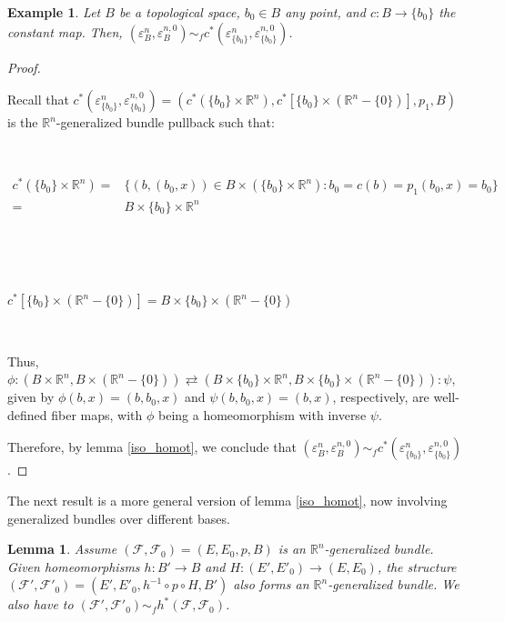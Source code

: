 \documentclass[12pt,oneside]{book}
\newtheorem{ex}     {Example}[chapter]
\newtheorem{lem}    {Lemma}[chapter]
\newcommand{\R}{\mathbb{R}}
\begin{document}
    \begin{ex}\label{fht_pullback_ex2}
        Let $B$ be a topological space, $b_{0} \in B$ any point, and $c:B \to \{ b_{0} \}$ the constant map. Then, 
        $(\varepsilon^{n}_{B}, \varepsilon^{n,0}_{B}) \sim_{f} c^{*}(\varepsilon^{n}_{\{ b_{0} \}}, \varepsilon^{n,0}_{\{ b_{0} \}})$.
    \end{ex}
    \begin{proof}

        \
        
        Recall that 
        $c^{*}(\varepsilon^{n}_{\{ b_{0} \}}, \varepsilon^{n,0}_{\{ b_{0} \}}) = (c^{*}(\{ b_{0} \} \times \R^{n}), c^{*}[\{ b_{0} \} \times (\R^{n} - \{ 0 \})], p_{1}, B)$ 
        is the $\R^{n}$-generalized bundle pullback such that:

        \
        
        $\begin{array}{rl}
        c^{*}(\{ b_{0} \} \times \R^{n}) = & \{ (b, (b_{0}, x)) \in B \times (\{ b_{0} \} \times \R^{n}) : b_{0} = c(b) = p_{1}(b_{0}, x) = b_{0} \} \\
        = & B \times \{ b_{0} \} \times \R^{n}
        \end{array}$

        \

        \
        
        $c^{*}[\{ b_{0} \} \times (\R^{n} - \{ 0 \})] = B \times \{ b_{0} \} \times (\R^{n} - \{ 0 \})$

        \
        
        Thus, $\phi:(B \times \R^{n}, B \times (\R^{n} - \{ 0 \})) \rightleftarrows (B \times \{ b_{0} \} \times \R^{n}, B \times \{ b_{0} \} \times (\R^{n} - \{ 0 \})) : \psi$, 
        given by $\phi(b, x) = (b, b_{0}, x)$ and $\psi(b, b_{0}, x) = (b, x)$, respectively, are well-defined fiber maps, with $\phi$ being a 
        homeomorphism with inverse $\psi$.
        
        Therefore, by lemma \ref{iso_homot}, we conclude that 
        $(\varepsilon^{n}_{B}, \varepsilon^{n,0}_{B}) \sim_{f} c^{*}(\varepsilon^{n}_{\{ b_{0} \}}, \varepsilon^{n,0}_{\{ b_{0} \}})$.
    \end{proof}
        
    The next result is a more general version of lemma \ref{iso_homot}, now involving generalized bundles over different bases.
        
    \begin{lem}\label{iso_homot_2}
        Assume $(\mathcal{F}, \mathcal{F}_{0}) = (E, E_{0}, p, B)$ is an $\R^{n}$-generalized bundle. Given homeomorphisms $h: B' \to B$ 
        and $H: (E', E'_{0}) \to (E, E_{0})$, the structure $(\mathcal{F'}, \mathcal{F'}_{0}) = (E', E'_{0}, h^{-1} \circ p \circ H, B')$ 
        also forms an $\R^{n}$-generalized bundle. We also have to 
        $(\mathcal{F'}, \mathcal{F'}_{0}) \sim_{f} h^{*}(\mathcal{F}, \mathcal{F}_{0})$.
    \end{lem}
\end{document}
